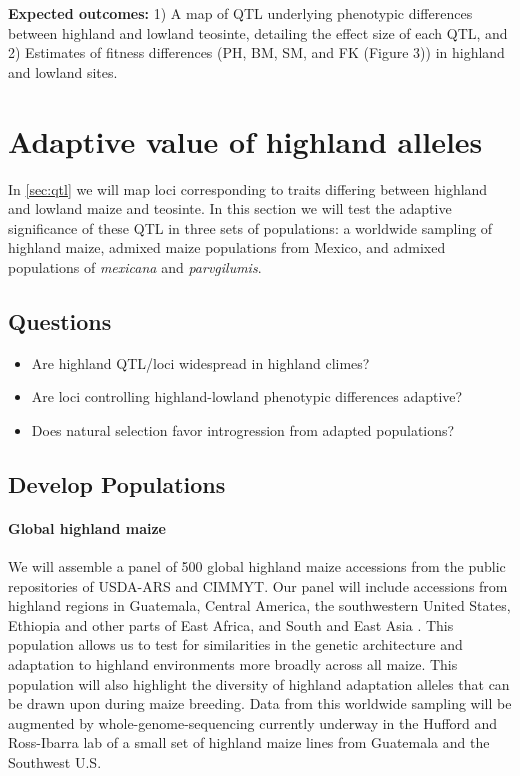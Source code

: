 {\bf Expected outcomes:} 1) A map of QTL underlying phenotypic differences between highland and lowland teosinte, detailing the effect size of each QTL, and 2) Estimates of fitness differences (PH, BM, SM, and FK (Figure 3)) in highland and lowland sites.
\section{Adaptive value of highland alleles} \label{sec:popgen}

In \ref{sec:qtl} we will map loci corresponding to traits differing between highland and lowland maize and teosinte. In this section we will test the adaptive significance of these QTL in three sets of populations: a worldwide sampling of highland maize, admixed maize populations from Mexico, and admixed populations of \emph{mexicana} and \emph{parvgilumis}. 

\subsection*{Questions}
\begin{itemize}[topsep=0pt,itemsep=-1ex,partopsep=1ex,parsep=1ex]
\item Are highland QTL/loci widespread in highland climes?
\item Are loci controlling highland-lowland phenotypic differences adaptive?
\item Does natural selection favor introgression from adapted populations?
\end{itemize}

\subsection{Develop Populations}

\paragraph{Global highland maize} 
We will assemble a panel of 500 global highland maize accessions from the public repositories of USDA-ARS and CIMMYT.  Our panel will include accessions from highland regions in Guatemala, Central America, the southwestern United States, Ethiopia and other parts of East Africa, and South and East Asia \citep{bjarnason1994subtropical}. This population allows us to test for similarities in the genetic architecture and adaptation to highland environments more broadly across all maize.  This population will also highlight the diversity of highland adaptation alleles that can be drawn upon during maize breeding.  Data from this worldwide sampling will be augmented by whole-genome-sequencing currently underway in the Hufford and Ross-Ibarra lab of a small set of highland maize lines from Guatemala and the Southwest U.S.


